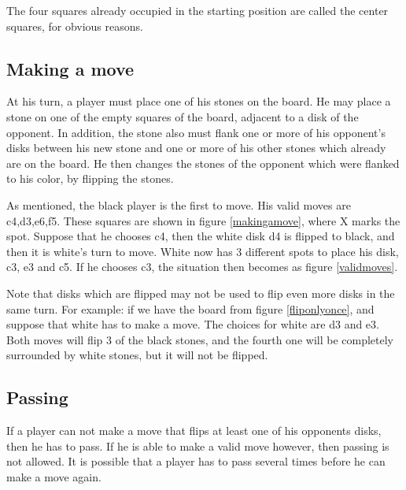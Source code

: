 \documentclass[12pt,twoside]{report}
\begin{document}
The four squares already occupied in the starting
position are called the center squares, for obvious
reasons.

\begin{figure}[ht]
\cornerpositions
\end{figure}


\subsection{Making a move}
At his turn, a player must place one of his stones on the board. He may
place a stone on one of the empty squares of the board, adjacent to
a disk of the opponent. In addition, the stone also must flank one or more of
his opponent's disks between his new stone and one or more of his
other stones which already are on the board. He then changes the stones
of the opponent which were flanked to his color, by flipping the stones.

\begin{figure}[h]
\makingamove
\end{figure}
As mentioned, the black player is the first to move. His valid moves are
c4,d3,e6,f5. These squares are shown in figure \ref{makingamove},
where X marks the spot.
Suppose that he chooses c4, then the white disk d4 is flipped to black, and then it is
white's turn to move. White now has 3 different spots to place his disk, c3, e3
and c5. If he chooses c3, the situation then becomes as figure \ref{validmoves}.

\begin{floatingfigure}{4cm}
\validmoves
\end{floatingfigure}
Note that disks which are flipped may not be used to flip even
more disks in the same turn. For example: if we have the board
from figure \ref{fliponlyonce}, and suppose that white has to make
a move. The choices for white are d3 and e3. Both moves will flip
3 of the black stones, and the fourth one will be completely
surrounded by white stones, but it will not be flipped.
\begin{figure} [ht]
\fliponlyonce
\end{figure}

\subsection{Passing} If a player can not make a move that flips at least one of his
opponents disks, then he has to pass. If he is able to make a valid move however, then
passing is not allowed. It is possible that a player has to pass several times
before he can make a move again.
\end{document}

